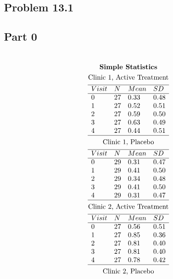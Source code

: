 \documentclass{article}
\begin{document}
\begin{flushleft}
\section*{Problem 13.1}
\subsection*{Part 0}
\begin{multline*}\\
\textbf{Simple Statistics}\\
\text{Clinic 1, Active Treatment}\\
\begin{array}{llll}
\hline
Visit & N & Mean & SD\\
\hline
0 & 27 & 0.33 & 0.48 \\ 
1 & 27 & 0.52 & 0.51 \\ 
2 & 27 & 0.59 & 0.50 \\ 
3 & 27 & 0.63 & 0.49 \\ 
4 & 27 & 0.44 & 0.51 \\ 
\hline
\end{array}\\
\text{Clinic 1, Placebo}\\
\begin{array}{llll}
\hline
Visit & N & Mean & SD\\
\hline
0 & 29 & 0.31 & 0.47 \\ 
1 & 29 & 0.41 & 0.50 \\ 
2 & 29 & 0.34 & 0.48 \\ 
3 & 29 & 0.41 & 0.50 \\ 
4 & 29 & 0.31 & 0.47 \\ 
\hline
\end{array}\\
\text{Clinic 2, Active Treatment}\\
\begin{array}{llll}
\hline
Visit & N & Mean & SD\\
\hline
0 & 27 & 0.56 & 0.51 \\ 
1 & 27 & 0.85 & 0.36 \\ 
2 & 27 & 0.81 & 0.40 \\ 
3 & 27 & 0.81 & 0.40 \\ 
4 & 27 & 0.78 & 0.42 \\ 
\hline
\end{array}\\
\text{Clinic 2, Placebo}\\
\begin{array}{llll}

\end{array}
\end{multline*}
\end{flushleft}
\end{document}

